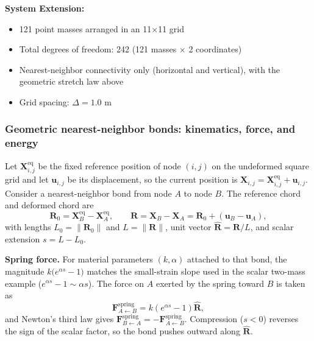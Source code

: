 \documentclass[11pt,a4paper]{article}
\begin{document}
\noindent \textbf{System Extension:}

\begin{itemize}
    \item 121 point masses arranged in an 11×11 grid
    \item Total degrees of freedom: 242 (121 masses × 2 coordinates)
    \item Nearest-neighbor connectivity only (horizontal and vertical), with the geometric stretch law above
    \item Grid spacing: $\Delta = 1.0$ m
\end{itemize}

\subsubsection{Geometric nearest-neighbor bonds: kinematics, force, and energy}
\label{subsec:geom_nn_bonds}

\noindent Let $\mathbf{X}_{i,j}^{\mathrm{eq}}$ be the fixed reference position of node $(i,j)$ on the undeformed square grid and let $\mathbf{u}_{i,j}$ be its displacement, so the current position is $\mathbf{X}_{i,j} = \mathbf{X}_{i,j}^{\mathrm{eq}} + \mathbf{u}_{i,j}$. Consider a nearest-neighbor bond from node $A$ to node $B$. The reference chord and deformed chord are
\begin{equation}
\mathbf{R}_0 = \mathbf{X}_B^{\mathrm{eq}} - \mathbf{X}_A^{\mathrm{eq}}, \qquad
\mathbf{R} = \mathbf{X}_B - \mathbf{X}_A = \mathbf{R}_0 + (\mathbf{u}_B - \mathbf{u}_A),
\label{eq:geom_Rdef}
\end{equation}
with lengths $L_0 = \|\mathbf{R}_0\|$ and $L = \|\mathbf{R}\|$, unit vector $\hat{\mathbf{R}} = \mathbf{R}/L$, and scalar extension $s = L - L_0$. \newline

\noindent \textbf{Spring force.} For material parameters $(k,\alpha)$ attached to that bond, the magnitude $k\bigl(e^{\alpha s}-1\bigr)$ matches the small-strain slope used in the scalar two-mass example ($e^{\alpha s}-1 \sim \alpha s$). The force on $A$ exerted by the spring toward $B$ is taken as
\begin{equation}
\mathbf{F}_{A \leftarrow B}^{\mathrm{spring}} = k\left(e^{\alpha s}-1\right)\hat{\mathbf{R}},
\label{eq:geom_Fspring}
\end{equation}
and Newton's third law gives $\mathbf{F}_{B \leftarrow A}^{\mathrm{spring}} = -\mathbf{F}_{A \leftarrow B}^{\mathrm{spring}}$. Compression ($s<0$) reverses the sign of the scalar factor, so the bond pushes outward along $\hat{\mathbf{R}}$. \newline
\end{document}
